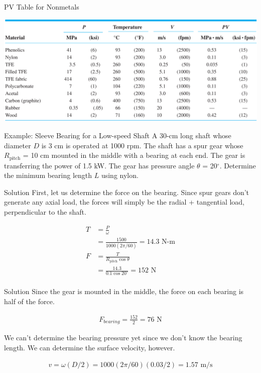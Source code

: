 \documentclass[10pt, svgnames]{beamer}
\begin{document}
\begin{frame}[label={sec:org71944fa}]{PV Table for Nonmetals}
\begin{center}
\includegraphics[width=\textwidth]{./pictures/pv-nonmetal.png}
\end{center}
\end{frame}

\begin{frame}[label={sec:orgeddfb66}]{Example: Sleeve Bearing for a Low-speed Shaft}
A 30-cm long shaft whose diameter \(D\) is 3 cm is operated at 1000 rpm. The shaft has a spur gear whose \(R_{\text{pitch}}\) = 10 cm mounted in the middle with a bearing at each end. The gear is transferring the power of 1.5 kW. The gear has pressure angle \(\theta\) = 20\(^{\circ}\). Determine the minimum bearing length \(L\) using nylon.
\end{frame}

\begin{frame}[label={sec:orgcdbdac8}]{Solution}
First, let us determine the force on the bearing. Since spur gears don't generate any axial load, the forces will simply be the radial + tangential load, perpendicular to the shaft.

\begin{align*}
    T &= \frac{P}{\omega} \\
      &= \frac{1500}{1000(2\pi / 60)} = 14.3 \text{ N-m} \\
    F &= \frac{T}{R_{\text{pitch}} \cos \theta} \\
      &= \frac{14.3}{0.1 \cos 20^{\circ}} = 152 \text{ N} \\
\end{align*}
\end{frame}

\begin{frame}[label={sec:org38faf86}]{Solution}
Since the gear is mounted in the middle, the force on each bearing is half of the force.

\begin{align*}
    F_{bearing} = \frac{152}{2} = 76 \text{ N}
\end{align*}

We can't determine the bearing pressure yet since we don't know the bearing length. We can determine the surface velocity, however.

\begin{align*}
    v = \omega (D/2) = 1000 (2\pi / 60) (0.03/2) = 1.57 \text{ m/s}
\end{align*}
\end{frame}
\end{document}
